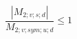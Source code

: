 \documentclass[12pt]{article}
\begin{document}
\begin{displaymath}
\frac {|M_{2;v;s;d}|} {M_{2;v;sym;u;d}} \leq 1
\end{displaymath}
\end{document}
